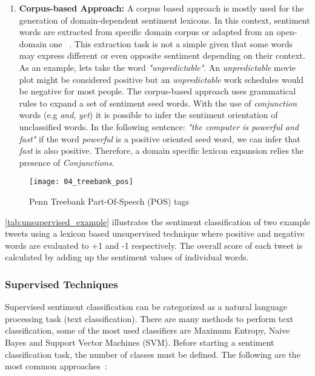 {\begin{enumerate}
\item \textbf{Corpus-based Approach:} A corpus based approach is mostly used for the generation of domain-dependent sentiment lexicons. In this context, sentiment words are extracted from specific domain corpus or adapted from an open-domain one ~\cite[p. 82]{liu2012sentiment}. This extraction task is not a simple given that some words may express different or even opposite sentiment depending on their context. As an example, lets take the word  \textit{"unpredictable"}. An \textit{unpredictable} movie plot might be considered positive but an \textit{unpredictable} work schedules would be negative for most people. The corpus-based approach uses grammatical rules to expand a set of sentiment seed words. With the use of \textit{conjunction} words (e.g \textit{and}, \textit{yet}) it is possible to infer the sentiment orientation of unclassified words. In the following sentence: \textit{"the computer is powerful and fast"} if the word \textit{powerful} is a positive oriented seed word, we can infer that \textit{fast} is also positive. Therefore, a domain specific lexicon expansion relies the presence of \textit{Conjunctions}.

\end{enumerate}

\begin{figure}
    \centering
    \caption[Penn Treebank Part-Of-Speech (POS) tags]{Penn Treebank Part-Of-Speech (POS) tags{~\cite[p. 33]{liu2012sentiment}}}
    \texttt{[image: 04\_treebank\_pos]}
    \label{fig4:treebank_pos}
\end{figure}


\autoref{tab:unsupervised_example} illustrates the sentiment classification of two example tweets using a lexicon based unsupervised technique where positive and negative words are evaluated to +1 and -1 respectively. The overall score of each tweet is calculated by adding up the sentiment values of individual words.

 \subsubsection{Supervised Techniques}
 
 Supervised sentiment classification can be categorized as a natural language processing task (text classification). There are many methods to perform text classification, some of the most used classifiers are Maximum Entropy, Naive Bayes and Support Vector Machines (SVM). Before starting a sentiment classification task, the number of classes must be defined. The following are the most common approaches~\cite{liu2012sentiment}:
 
}
